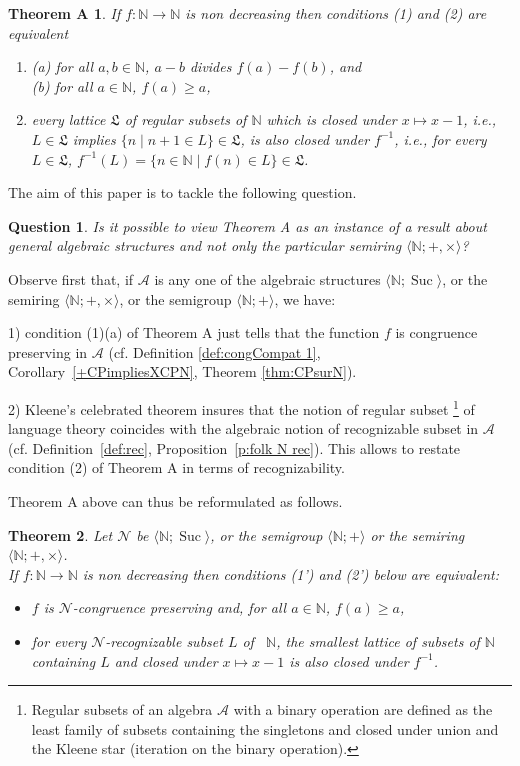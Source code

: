 \documentclass[11pt,a4paper]{article}
\newtheorem{theorem}{Theorem}[section]
\newtheorem*{theoremA*}{Theorem A}
\newtheorem{question}[theorem]{Question}
\theoremstyle{definition} %
\newcommand\+[1]{\mathcal{#1}} %
\newcommand{\N}{{\mathbb N}}     %
\newcommand{\Latt}{{\mathfrak{L}}}
\DeclareMathOperator{\suc}{Suc}%
\begin{document}
\begin{theoremA*}\label{thm origin}
If $f:\N\longrightarrow\N$ is non decreasing then conditions (1) and (2) are equivalent
\begin{enumerate}
\item  (a) for all $a,b\in\N$, $a-b$ divides $f(a)-f(b)$, and\\
          (b) for all $a\in\N$, $f(a)\geq a$,
\item  every lattice  $\Latt$ of  regular  subsets of $\N$ which is closed under $x\mapsto x-1$, i.e., $L\in\Latt$ implies $\{n\mid n+1\in L\}\in\Latt$, is  also closed under $f^{-1}$,  i.e., for every $L\in\Latt$, $f^{-1}(L)=\{n\in\N\mid f(n)\in L\}\in \Latt$.
\end{enumerate}
\end{theoremA*}
%
The aim of this paper is to tackle the following question.
%
\begin{question}\label{question}
Is it possible to view Theorem A as an instance of a result 
about general algebraic structures 
and not only the particular semiring $\langle \N;+,\times\rangle$?
\end{question}

Observe first that, if $\+A$ is any one of the algebraic structures $\langle\N;\suc\rangle$, or  the semiring $\langle\N;+,\times\rangle$, or  the semigroup $\langle\N;+\rangle$, we have:

1) condition (1)(a) of Theorem A just tells that the function $f$ is 
 congruence preserving in $\+A$ (cf. Definition \ref{def:congCompat 1},
 Corollary~\ref{+CPimpliesXCPN}, Theorem \ref{thm:CPsurN}).
 
 2)  Kleene's celebrated theorem insures that 
the notion of regular subset \footnote{Regular subsets of an algebra $\+A$ with a binary operation are defined as the least family of subsets containing the singletons and closed under union and the Kleene star  (iteration on the binary operation).} of language theory 
coincides with the algebraic notion of recognizable subset in $\+A$
(cf. Definition~\ref{def:rec}, Proposition~\ref{p:folk N rec}).
This allows to restate condition (2) of Theorem A in terms of recognizability.


 Theorem A above can thus  be reformulated as follows.
%
\begin{theorem}\label{thm:ipl1}
Let $\+N$ be  $\langle\N;\suc\rangle$, or the semigroup $\langle\N;+\rangle$ 
or the semiring $\langle\N;+,\times\rangle$.
\\
If $f:\N\longrightarrow\N$ is non decreasing %
 then conditions (1') and (2') below are equivalent:
\itemsep 0pt
\begin{itemize}
\item[(1')] 
$f$ is  $\+N$-congruence preserving and, for all $a\in\N$, $f(a)\geq a$,
\item[(2')] 
for every $\+N$-recognizable subset $L$ of \ $\N$, the smallest  lattice of subsets of $\N$ containing $L$  and closed under $x\mapsto x-1$ is  also closed under $f^{-1}$.
\end{itemize}
\end{theorem}
%
\end{document}
